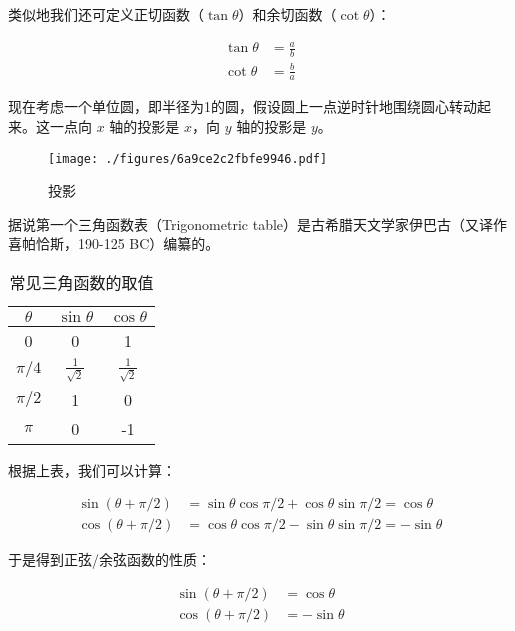 类似地我们还可定义正切函数（$\tan \theta$）和余切函数（$\cot \theta$）：

\begin{equation}
\begin{aligned}
\tan \theta & = \frac{a}{b} \\
\cot \theta & = \frac{b}{a}
\end{aligned}
\end{equation}

现在考虑一个单位圆，即半径为1的圆，假设圆上一点逆时针地围绕圆心转动起来。这一点向 $x$ 轴的投影是 $x$，向 $y$ 轴的投影是 $y$。

\begin{figure}[ht]
\centering
\texttt{[image: ./figures/6a9ce2c2fbfe9946.pdf]}
\caption{投影} \label{fig_AtomId_6}
\end{figure}

据说第一个三角函数表（Trigonometric table）是古希腊天文学家伊巴古（又译作喜帕恰斯，190-125 BC）编纂的。

\begin{table}[ht]
\centering
\caption{常见三角函数的取值}\label{tab_AtomId_2}
\begin{tabular}{|c|c|c|}
\hline
$\theta$ & $\sin \theta$ &  $\cos \theta$ \\
\hline
0  &  0 &  1 \\
\hline
$\pi/4$ & $\frac{1}{\sqrt 2}$  & $\frac{1}{\sqrt 2}$ \\
\hline
$\pi/2$ & 1  &  0 \\
\hline
$\pi$ & 0 & -1 \\
\hline
\end{tabular}
\end{table}

根据上表，我们可以计算：

\begin{equation}
\begin{aligned}
\sin ( \theta + \pi /2) & = \sin \theta \cos \pi /2 + \cos \theta  \sin \pi/2 = \cos \theta \\
\cos ( \theta + \pi /2) & = \cos  \theta \cos \pi /2 - \sin \theta \sin \pi/2 = - \sin \theta
\end{aligned}
\end{equation}

于是得到正弦/余弦函数的性质：

\begin{equation}
\begin{aligned}
\sin ( \theta + \pi /2 ) & = \cos \theta \\
\cos ( \theta + \pi /2) & = - \sin \theta
\end{aligned}
\end{equation}

